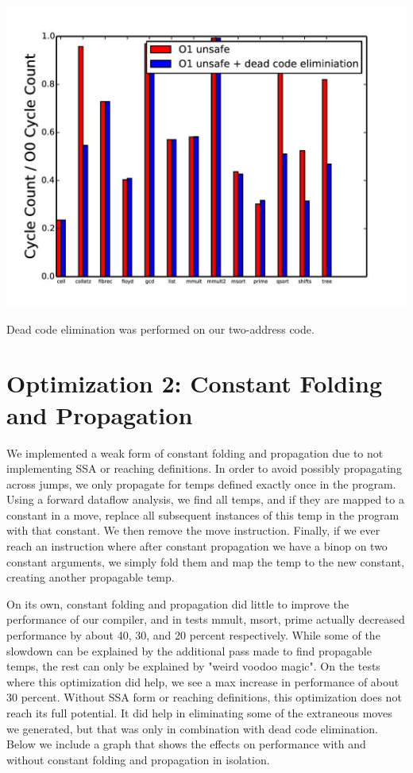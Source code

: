 \documentclass{article}
\begin{document}
\includegraphics[scale=0.5]{O1_vs_deadcode-page-001}

Dead code elimination was performed on our two-address code.

\section{Optimization 2: Constant Folding and Propagation}

We implemented a weak form of constant folding and propagation due to not implementing SSA or reaching definitions. In order to avoid possibly propagating across jumps, we only propagate for temps defined exactly once in the program. Using a forward dataflow analysis, we find all temps, and if they are mapped to a constant in a move, replace all subsequent instances of this temp in the program with that constant. We then remove the move instruction. Finally, if we ever reach an instruction where after constant propagation we have a binop on two constant arguments, we simply fold them and map the temp to the new constant, creating another propagable temp.

On its own, constant folding and propagation did little to improve the performance of our compiler, and in tests mmult, msort, prime actually decreased performance by about 40, 30, and 20 percent respectively. While some of the slowdown can be explained by the additional pass made to find propagable temps, the rest can only be explained by "weird voodoo magic". On the tests where this optimization did help, we see a max increase in performance of about 30 percent. Without SSA form or reaching definitions, this optimization does not reach its full potential. It did help in eliminating some of the extraneous moves we generated, but that was only in combination with dead code elimination. Below we include a graph that shows the effects on performance with and without constant folding and propagation in isolation.
\end{document}
